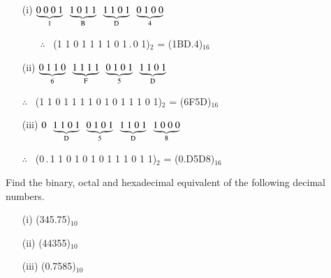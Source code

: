 \begin{solution}
\begin{itemize}
\item[(i)] $\underbrace{0~0~0~1}_{1} \ \ \underbrace{1~0~1~1}_{\rmB} \ \ \underbrace{1~1~0~1}_{\rmD} \ \ \underbrace{0~1~0~0}_{4}$

\smallskip
\qquad\quad~~~ $\therefore$~ (1 1 0 1 1 1 1 0 1\,.\,0 1)$_{2}$ = (1BD.4)$_{16}$

\item[(ii)] $\underbrace{0~1~1~0}_{6} \ \ \underbrace{1~1~1~1}_{\rmF} \ \ \underbrace{0~1~0~1}_{5} \ \ \underbrace{1~1~0~1}_{\rmD}$

\smallskip
$\therefore$~ (1 1 0 1 1 1 1 0 1 0 1 1 1 0 1)$_{2}$ = (6F5D)$_{16}$

\item[(iii)] $0 \ \ \underbrace{1~1~0~1}_{\rmD} \ \ \underbrace{0~1~0~1}_{5} \ \ \underbrace{1~1~0~1}_{\rmD} \ \ \underbrace{1~0~0~0}_{8}$

\smallskip
$\therefore$~ (0\,.\,1 1 0 1 0 1 0 1 1 1 0 1 1)$_{2}$ = (0.D5D8)$_{16}$
\end{itemize}
\end{solution}

\begin{problem}\label{prob5.22}
Find the binary, octal and hexadecimal equivalent of the following decimal numbers.
\begin{itemize}
\item[(i)] (345.75)$_{10}$

\item[(ii)] (44355)$_{10}$

\item[(iii)] (0.7585)$_{10}$
\end{itemize}
\end{problem}

